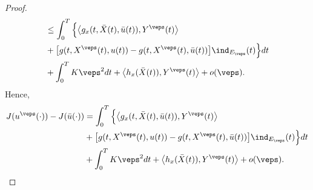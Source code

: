 \begin{proof}
\begin{align*}
        &\leq \int_{0}^{T} \Big\{
            \big\langle g_x(t, \Bar{X}(t), \Bar{u}(t)), Y^{\veps}(t) \big\rangle \\
        &+ \big[g(t, X^{\veps}(t),u(t)) - g(t, X^{\veps}(t),\Bar{u}(t))\big]\ind_{E_{\veps}}(t)
        \Big\}dt \\
        &+ \int_{0}^{T}K\veps^{2}dt + \left\langle h_{x}(\Bar{X}(t)), Y^{\veps}(t)\right\rangle + o(\veps).
    \end{align*}
    Hence,
    \begin{equation*}
        \begin{aligned}
            J(u^{\veps}(\cdot)) - J(\Bar{u}(\cdot)) 
            &= \int_{0}^{T} \Big\{ \big\langle g_x(t, \Bar{X}(t), \Bar{u}(t)), Y^{\veps}(t) \big\rangle \\
            &+ \big[g(t, X^{\veps}(t),u(t)) - g(t, X^{\veps}(t),\Bar{u}(t))\big]\ind_{E_{\veps}}(t) \Big\}dt \\
            &+ \int_{0}^{T}K\veps^{2}dt + \left\langle h_{x}(\Bar{X}(t)), Y^{\veps}(t)\right\rangle + o(\veps).
        \end{aligned}
    \end{equation*}
\end{proof}